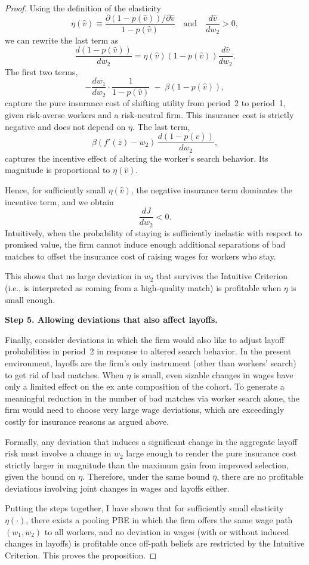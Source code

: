 \begin{proof}
Using the definition of the elasticity
\[
\eta(\hat{v}) \equiv \frac{\partial (1-p(\hat{v}))/\partial \hat{v}}{1-p(\hat{v})}
\quad\text{and}\quad
\frac{d \hat{v}}{d w_2} > 0,
\]
we can rewrite the last term as
\[
\frac{d(1-p(\hat{v}))}{d w_2}
=
\eta(\hat{v}) (1-p(\hat{v})) \frac{d \hat{v}}{d w_2}.
\]
The first two terms,
\[
- \frac{d w_1}{d w_2} \cdot \frac{1}{1-p(\hat{v})}
\;-\;
\beta (1-p(\hat{v})),
\]
capture the pure insurance cost of shifting utility from period~2 to period~1, given risk-averse workers and a risk-neutral firm. This insurance cost is strictly negative and does not depend on $\eta$. The last term,
\[
\beta (f'(\bar{z}) - w_2)\, \frac{d(1-p(\hat{v}))}{d w_2},
\]
captures the incentive effect of altering the worker's search behavior. Its magnitude is proportional to $\eta(\hat{v})$.

Hence, for sufficiently small $\eta(\hat{v})$, the negative insurance term dominates the incentive term, and we obtain
\[
\frac{d J}{d w_2} < 0.
\]
Intuitively, when the probability of staying is sufficiently inelastic with respect to promised value, the firm cannot induce enough additional separations of bad matches to offset the insurance cost of raising wages for workers who stay.

This shows that no large deviation in $w_2$ that survives the Intuitive Criterion (i.e., is interpreted as coming from a high-quality match) is profitable when $\eta$ is small enough.

\medskip
\noindent\textbf{Step 5. Allowing deviations that also affect layoffs.}

Finally, consider deviations in which the firm would also like to adjust layoff probabilities in period~2 in response to altered search behavior. In the present environment, layoffs are the firm’s only instrument (other than workers’ search) to get rid of bad matches. When $\eta$ is small, even sizable changes in wages have only a limited effect on the ex ante composition of the cohort. To generate a meaningful reduction in the number of bad matches via worker search alone, the firm would need to choose very large wage deviations, which are exceedingly costly for insurance reasons as argued above.

Formally, any deviation that induces a significant change in the aggregate layoff risk must involve a change in $w_2$ large enough to render the pure insurance cost strictly larger in magnitude than the maximum gain from improved selection, given the bound on $\eta$. Therefore, under the same bound $\bar{\eta}$, there are no profitable deviations involving joint changes in wages and layoffs either.

\medskip
Putting the steps together, I have shown that for sufficiently small elasticity $\eta(\cdot)$, there exists a pooling PBE in which the firm offers the same wage path $(w_1,w_2)$ to all workers, and no deviation in wages (with or without induced changes in layoffs) is profitable once off-path beliefs are restricted by the Intuitive Criterion. This proves the proposition.
\end{proof}





